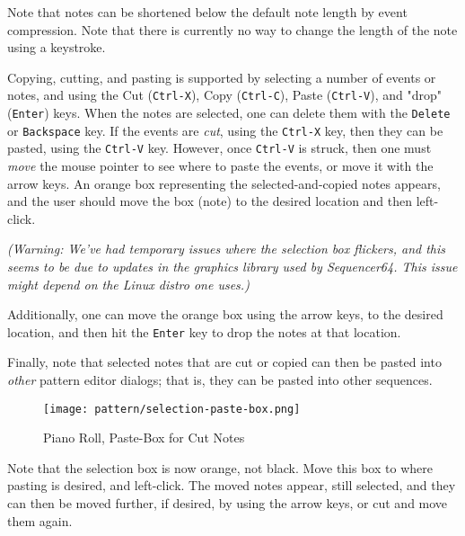    Note that notes can be shortened below the default note length by event
   compression.  Note that there is currently no way to change the length of
   the note using a keystroke.

   Copying, cutting, and pasting is supported by selecting a number of events
   or notes, and using the
    Cut (\texttt{Ctrl-X}), 
    Copy (\texttt{Ctrl-C}),
    Paste (\texttt{Ctrl-V}), and
   "drop" (\texttt{Enter})
   keys.
   When the notes are selected,
   one can delete them with the \texttt{Delete} or \texttt{Backspace} key.
   If the events are \textsl{cut}, using the \texttt{Ctrl-X} key, then
   they can be pasted, using the \texttt{Ctrl-V} key.  However,
   once \texttt{Ctrl-V} is struck, then one must \textsl{move} the mouse
   pointer to see where to paste the events, or move it with the arrow keys.
   An orange box representing the
   selected-and-copied notes appears, and the user should move the box (note)
   to the desired location and then left-click.

   \textsl{
   (Warning:  We've had temporary issues where the selection box flickers, and
   this seems to be due to updates in the graphics library used by
   \textsl{Sequencer64}.  This issue might depend on the Linux distro one
   uses.)
   }

   Additionally, one can move the orange box using the arrow keys, to the
   desired location, and then hit the
    \texttt{Enter} key to
   drop the notes at that location.

   Finally, note that selected notes that are cut or copied can then be
   pasted into \textsl{other} pattern editor dialogs; that is, they can be
   pasted into other sequences.

\begin{figure}[H]
   \centering 
   \texttt{[image: pattern/selection-paste-box.png]}
   \caption{Piano Roll, Paste-Box for Cut Notes}
   \label{fig:pattern_editor_selection_paste_box}
\end{figure}
   
   Note that the selection box is now orange, not black.
   Move this box to where pasting is
   desired, and left-click.  The moved notes appear, still selected,
   and they can then be moved further, if desired, by using the arrow keys, or
   cut and move them again.

